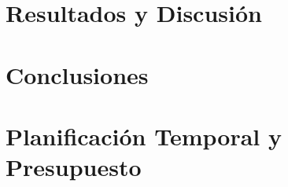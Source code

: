 \documentclass[a4paper,11pt,twoside]{report}
\begin{document}
\chapter{Resultados y Discusión}


\chapter{Conclusiones}


\chapter{Planificación Temporal y Presupuesto}


\newpage
{}
\printbibliography
\end{document}
